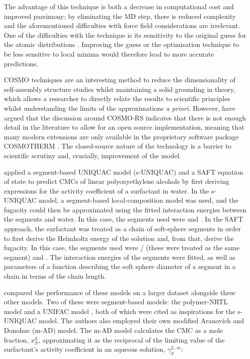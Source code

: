 The advantage of this technique is both a decrease in computational cost and
improved parsimony; by eliminating the MD step, there is reduced complexity and
the aforementioned difficulties with force field considerations are irrelevant.
One of the difficulties with the technique is its sensitivity to the original
guess for the atomic distributions
\cite{klamtCOSMOplexSelfconsistentSimulation2019}. Improving the guess or the
optimisation technique to be less sensitive to local minima would therefore lead
to more accurate predictions.

COSMO techniques are an interesting method to reduce the dimensionality of
self-assembly structure studies whilst maintaining a solid grounding in theory,
which allows a researcher to directly relate the results to scientific
principles whilst understanding the limits of the approximations \emph{a
priori}. However, \citet{herbertDielectricContinuumMethods2021} have argued that
the discussion around COSMO-RS indicates that there is not enough detail in the
literature to allow for an open source implementation, meaning that many modern
extensions are only available in the proprietary software package
\textsc{COSMOTHERM} \cite{eckertFastSolventScreening2002}. The closed-source
nature of the technology is a barrier to scientific scrutiny and, crucially,
improvement of the model.

\citet{liStudiesUNIQUACSAFT1998} applied a segment-based UNIQUAC model (s-UNIQUAC) and a SAFT equation of state to predict CMCs of linear polyoxyethylene alcohols by first deriving expressions for the activity coefficient of a surfactant in water. In the s-UNIQUAC model, a segment-based local-composition model was used, and the fugacity could then be approximated using the fitted interaction energies between the segments and water. In this case, the segments used were  and . In the SAFT approach, the surfactant was treated as a chain of soft-sphere segments in order to first derive the Helmholtz energy of the solution and, from that, derive the fugacity. In this case, the segments used were / (these were treated as the same segment) and . The interaction energies of the segments were fitted, as well as parameters of a function describing the soft sphere diameter of a segment in a chain in terms of the chain length.

\citet{chengCorrelationCriticalMicelle2005} compared the performance of these models on a larger dataset alongside three other models. Two of these were segment-based models: the polymer-NRTL model \cite{liStudiesUNIQUACSAFT1998} and
a UNIFAC model \cite{voutsasPredictionCriticalMicelle2001}, both of which were cited as inspirations for the s-UNIQUAC model. The authors also employed their own modified Aranovich and Donohue (m-AD) model. The m-AD model calculates the
CMC as a mole fraction, $x_S^L$, approximating it as the reciprocal of the limiting value of the surfactant's activity coefficient in an aqueous solution,
$\gamma_S^{L,\infty}$:

